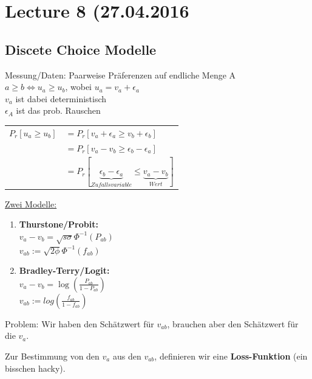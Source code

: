 
\section*{Lecture 8 (27.04.2016}
\subsection*{Discete Choice Modelle}

Messung/Daten: Paarweise Präferenzen auf endliche Menge A\\

$a \geq b \Leftrightarrow u_a \geq u_b$, wobei $u_a = v_a+ \epsilon_a$\\
$v_a$ ist dabei deterministisch\\
$\epsilon_A$ ist das prob. Rauschen\\

\begin{center}


\begin{tabular}{r l}
$P_r[u_a \geq u_b]$&$ = P_r[v_a + \epsilon_a \geq v_b + \epsilon_b]$\\
&$ = P_r[v_a -v_b \geq \epsilon_b - \epsilon_a]$\\
&$ = P_r[\underbrace{\epsilon_b - \epsilon_a}_{Zufallsvariable} \leq \underbrace{v_a -v_b}_{Wert} ]$
\end{tabular}
\end{center}


\underline{Zwei Modelle:} 
\begin{enumerate}
\item \textbf{Thurstone/Probit:}\\ $v_a - v_b = \sqrt{s \sigma} \Phi^{-1}(P_{ab})$\\$v_{ab} := \sqrt{2\phi} \Phi^{-1}(f_{ab})$

\item \textbf{Bradley-Terry/Logit:} \\$v_a - v_b = \log(\frac{P_{ab}}{1-P_{ab}})$\\$v_{ab} := log(\frac{f_{ab}}{1-f_{ab}})$

\end{enumerate}

Problem: Wir haben den Schätzwert für $v_{ab}$, brauchen aber den Schätzwert für die $v_a$.\newline\newline

Zur Bestimmung von den $v_a$ aus den $v_{ab}$, definieren wir eine \textbf{Loss-Funktion} (ein bisschen hacky).

